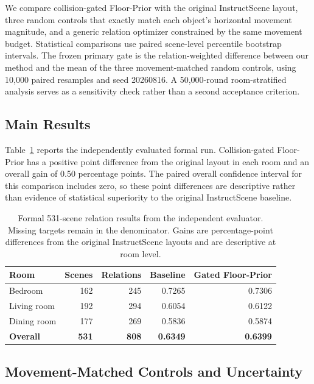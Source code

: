 \documentclass{article}
\newcommand{\fp}{Floor-Prior}
\begin{document}
We compare collision-gated \fp{} with the original InstructScene layout, three random controls that exactly match each object's horizontal movement magnitude, and a generic relation optimizer constrained by the same movement budget. Statistical comparisons use paired scene-level percentile bootstrap intervals. The frozen primary gate is the relation-weighted difference between our method and the mean of the three movement-matched random controls, using 10,000 paired resamples and seed 20260816. A 50,000-round room-stratified analysis serves as a sensitivity check rather than a second acceptance criterion.

\subsection{Main Results}

Table~\ref{tab:main} reports the independently evaluated formal run. Collision-gated \fp{} has a positive point difference from the original layout in each room and an overall gain of 0.50 percentage points. The paired overall confidence interval for this comparison includes zero, so these point differences are descriptive rather than evidence of statistical superiority to the original InstructScene baseline.

\begin{table}[t]
\centering
\caption{Formal 531-scene relation results from the independent evaluator. Missing targets remain in the denominator. Gains are percentage-point differences from the original InstructScene layouts and are descriptive at room level.}
\label{tab:main}
\begin{tabular}{lrrrr}
\toprule
Room & Scenes & Relations & Baseline & Gated \fp{} \\
\midrule
Bedroom & 162 & 245 & 0.7265 & 0.7306 \\
Living room & 192 & 294 & 0.6054 & 0.6122 \\
Dining room & 177 & 269 & 0.5836 & 0.5874 \\
\textbf{Overall} & \textbf{531} & \textbf{808} & \textbf{0.6349} & \textbf{0.6399} \\
\bottomrule
\end{tabular}
\end{table}

\subsection{Movement-Matched Controls and Uncertainty}
\end{document}

